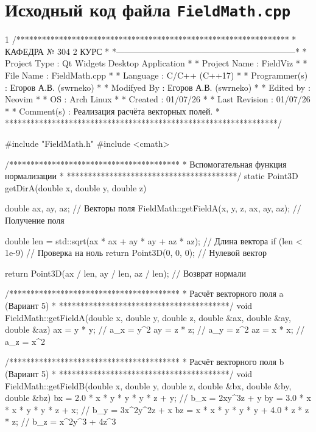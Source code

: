 \section{Исходный код файла \texttt{FieldMath.cpp}}
\footnotesize
\begin{listing}{1}
/****************************************************************
*                     КАФЕДРА № 304 2 КУРС                       *
*---------------------------------------------------------------*
* Project Type  : Qt Widgets Desktop Application                *
* Project Name  : FieldViz                                      *
* File Name     : FieldMath.cpp                                  *
* Language      : C/C++ (C++17)                                  *
* Programmer(s) : Егоров А.В. (swrneko)                          *
* Modifyed By   : Егоров А.В. (swrneko)                          *
* Edited by     : Neovim                                         *
* OS            : Arch Linux                                     *
* Created       : 01/07/26                                       *
* Last Revision : 01/07/26                                       *
* Comment(s)    : Реализация расчёта векторных полей.            *
****************************************************************/

#include "FieldMath.h"
#include <cmath>

/****************************************
* Вспомогательная функция нормализации  *
****************************************/
static Point3D getDirA(double x, double y, double z) {
  double ax, ay, az; // Векторы поля
  FieldMath::getFieldA(x, y, z, ax, ay, az); // Получение поля

  double len = std::sqrt(ax * ax + ay * ay + az * az); // Длина вектора
  if (len < 1e-9) { // Проверка на ноль
    return Point3D(0, 0, 0); // Нулевой вектор
  }

  return Point3D(ax / len, ay / len, az / len); // Возврат нормали
}

/****************************************
* Расчёт векторного поля a (Вариант 5)  *
****************************************/
void FieldMath::getFieldA(double x, double y, double z, double &ax, double &ay, double &az) {
  ax = y * y; // a_x = y^2
  ay = z * z; // a_y = z^2
  az = x * x; // a_z = x^2
}

/****************************************
* Расчёт векторного поля b (Вариант 5)  *
****************************************/
void FieldMath::getFieldB(double x, double y, double z, double &bx, double &by, double &bz) {
  bx = 2.0 * x * y * y * y * z + y; // b_x = 2xy^3z + y
  by = 3.0 * x * x * y * y * z + x; // b_y = 3x^2y^2z + x
  bz = x * x * y * y * y + 4.0 * z * z * z; // b_z = x^2y^3 + 4z^3
}


\end{listing}
